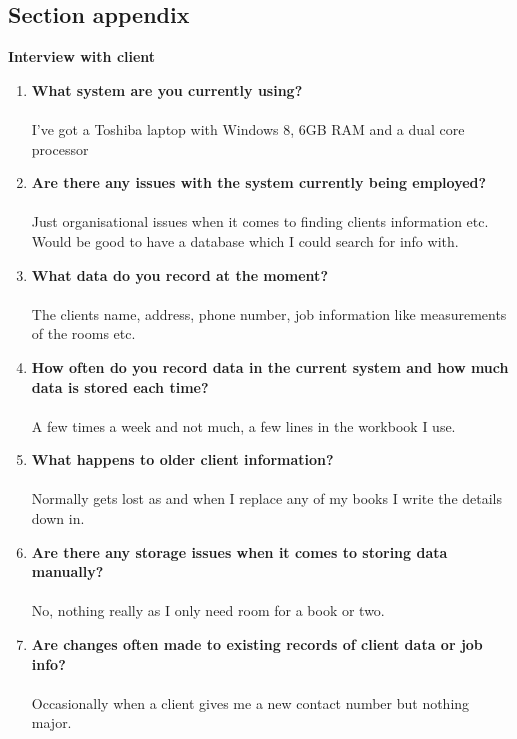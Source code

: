 		





\subsection{Section appendix}


\begin{flushleft}
	\textbf{Interview with client}
\end{flushleft}


\begin{enumerate}
	\item \textbf{What system are you currently using?}
		\\ \\ I've got a Toshiba laptop with Windows 8, 6GB RAM and a dual core processor
	\item \textbf{Are there any issues with the system currently being employed?}
		\\ \\Just organisational issues when it comes to finding clients information etc. Would be good to have a database which I could search for info with.
	\item \textbf{What data do you record at the moment?}
		\\ \\ The clients name, address, phone number, job information like measurements of the rooms etc.
	\item \textbf{How often do you record data in the current system and how much data is stored each time?}
		\\ \\ A few times a week and not much, a few lines in the workbook I use.
	\item \textbf{What happens to older client information?}
		\\ \\ Normally gets lost as and when I replace any of my books I write the details down in.
	\item \textbf{Are there any storage issues when it comes to storing data manually?}
		\\ \\ No, nothing really as I only need room for a book or two.
	\item \textbf{Are changes often made to existing records of client data or job info?}
		\\ \\ Occasionally when a client gives me a new contact number but nothing major.

\end{enumerate}
